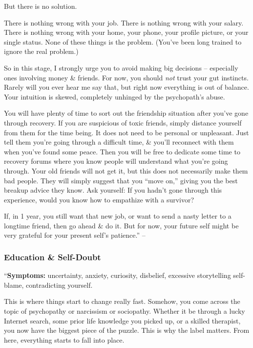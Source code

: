 \documentclass{article}
\numberwithin{equation}{section}
\begin{document}
But there is no solution.

There is nothing wrong with your job. There is nothing wrong with your salary. There is nothing wrong with your home, your phone, your profile picture, or your single status. None of these things is the problem. (You've been long trained to ignore the real problem.)

So in this stage, I strongly urge you to avoid making big decisions -- especially ones involving money \& friends. For now, you should \textit{not} trust your gut instincts. Rarely will you ever hear me say that, but right now everything is out of balance. Your intuition is skewed, completely unhinged by the psychopath's abuse.

You will have plenty of time to sort out the friendship situation after you've gone through recovery. If you are suspicious of toxic friends, simply distance yourself from them for the time being. It does not need to be personal or unpleasant. Just tell them you're going through a difficult time, \& you'll reconnect with them when you've found some peace. Then you will be free to dedicate some time to recovery forums where you know people will understand what you're going through. Your old friends will not get it, but this does not necessarily make them bad people. They will simply suggest that you ``move on,'' giving you the best breakup advice they know. Ask yourself: If you hadn't gone through this experience, would you know how to empathize with a survivor?

If, in 1 year, you still want that new job, or want to send a nasty letter to a longtime friend, then go ahead \& do it. But for now, your future self might be very grateful for your present self's patience.'' -- \cite[pp. 98--99]{MacKenzie2015}

\subsubsection{Education \& Self-Doubt}
``\textbf{Symptoms:} uncertainty, anxiety, curiosity, disbelief, excessive storytelling self-blame, contradicting yourself.

This is where things start to change really fast. Somehow, you come across the topic of psychopathy or narcissism or sociopathy. Whether it be through a lucky Internet search, some prior life knowledge you picked up, or a skilled therapist, you now have the biggest piece of the puzzle. This is why the label matters. From here, everything starts to fall into place.
\end{document}
